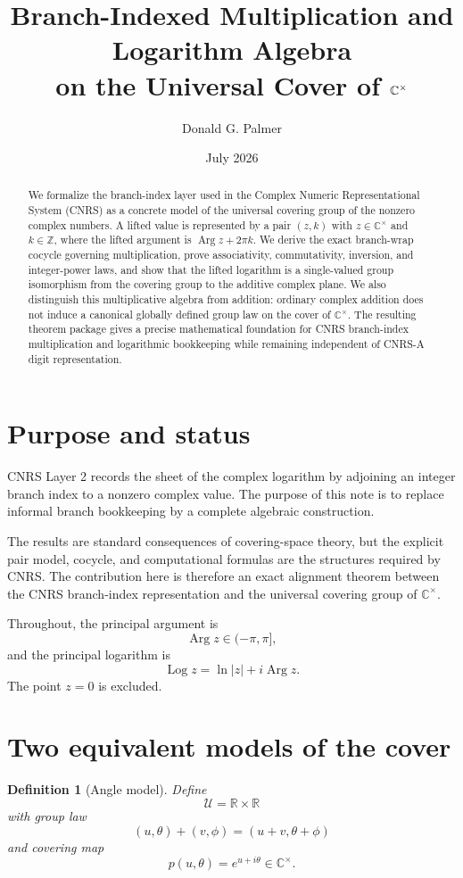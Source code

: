 \documentclass[11pt]{article}
\title{Branch-Indexed Multiplication and Logarithm Algebra\\on the Universal Cover of $\C^{\times}$}
\author{Donald G. Palmer}
\date{July 2026}
\newtheorem{definition}[theorem]{Definition}
\newcommand{\C}{\mathbb C}
\newcommand{\Z}{\mathbb Z}
\newcommand{\R}{\mathbb R}
\newcommand{\Argp}{\operatorname{Arg}}
\newcommand{\Logp}{\operatorname{Log}}
\begin{document}
\maketitle

\begin{abstract}
We formalize the branch-index layer used in the Complex Numeric Representational System (CNRS) as a concrete model of the universal covering group of the nonzero complex numbers.  A lifted value is represented by a pair $(z,k)$ with $z\in\C^{\times}$ and $k\in\Z$, where the lifted argument is $\Argp z+2\pi k$.  We derive the exact branch-wrap cocycle governing multiplication, prove associativity, commutativity, inversion, and integer-power laws, and show that the lifted logarithm is a single-valued group isomorphism from the covering group to the additive complex plane.  We also distinguish this multiplicative algebra from addition: ordinary complex addition does not induce a canonical globally defined group law on the cover of $\C^{\times}$.  The resulting theorem package gives a precise mathematical foundation for CNRS branch-index multiplication and logarithmic bookkeeping while remaining independent of CNRS-A digit representation.
\end{abstract}

\section{Purpose and status}
CNRS Layer 2 records the sheet of the complex logarithm by adjoining an integer branch index to a nonzero complex value.  The purpose of this note is to replace informal branch bookkeeping by a complete algebraic construction.

The results are standard consequences of covering-space theory, but the explicit pair model, cocycle, and computational formulas are the structures required by CNRS.  The contribution here is therefore an exact alignment theorem between the CNRS branch-index representation and the universal covering group of $\C^{\times}$.

Throughout, the principal argument is
\[
\Argp z\in(-\pi,\pi],
\]
and the principal logarithm is
\[
\Logp z=\ln|z|+i\Argp z.
\]
The point $z=0$ is excluded.

\section{Two equivalent models of the cover}

\begin{definition}[Angle model]
Define
\[
\mathcal U=\R\times\R
\]
with group law
\[
(u,\theta)+(v,\phi)=(u+v,\theta+\phi)
\]
and covering map
\[
p(u,\theta)=e^{u+i\theta}\in\C^{\times}.
\]
\end{definition}
\end{document}
